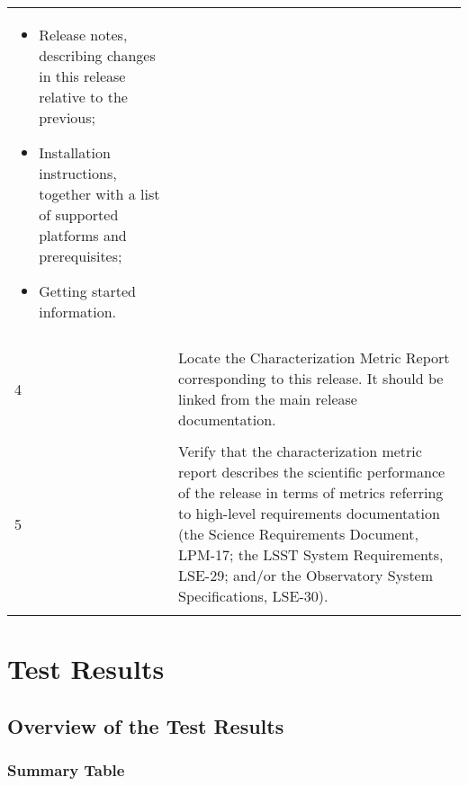 \documentclass[DM,lsstdraft,STR,toc]{lsstdoc}
\providecommand{\tightlist}{
  \setlength{\itemsep}{0pt}\setlength{\parskip}{0pt}}
\begin{document}
\begin{longtable}[]{p{1.3cm}p{15cm}}
\begin{minipage}[t]{13cm}
{\begin{itemize}
\tightlist
\item
  Release notes, describing changes in this release relative to the
  previous;
\item
  Installation instructions, together with a list of supported platforms
  and prerequisites;
\item
  Getting started information.
\end{itemize}

\vspace{\dp0}
} \end{minipage} \\
\\ \midrule
\multirow{1}{*}{ 4 } &
\begin{minipage}[t]{13cm}{\footnotesize
Locate the Characterization Metric Report corresponding to this release.
It should be linked from the main release documentation.

\vspace{\dp0}
} \end{minipage} \\
\\ \midrule
\multirow{1}{*}{ 5 } &
\begin{minipage}[t]{13cm}{\footnotesize
Verify that the characterization metric report describes the scientific
performance of the release in terms of metrics referring to high-level
requirements documentation (the Science Requirements Document, LPM-17;
the LSST System Requirements, LSE-29; and/or the Observatory System
Specifications, LSE-30).

\vspace{\dp0}
} \end{minipage} \\
\\ \midrule

\end{longtable}




\newpage

\section{Test Results}
\label{sect:testresults}

\subsection{Overview of the Test Results}
\label{sect:overview}

\subsubsection{Summary Table}
\label{sect:summarytable}
\end{document}
